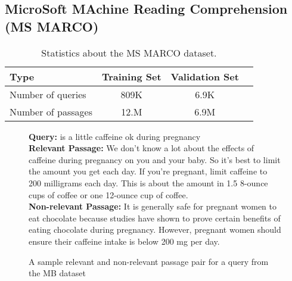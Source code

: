 \subsection{MicroSoft MAchine Reading Comprehension (MS MARCO)}

\begin{table}[b]
\vspace{0.2cm}
\centering
\begin{tabular}{lccc}
\toprule
\textbf{Type} \mbox{\hspace{0.5cm}} & \textbf{Training Set} \mbox{\hspace{1.0cm}} & \textbf{Validation Set} \mbox{\hspace{1.0cm}} \\
\toprule
Number of queries & 809K & 6.9K \\
Number  of passages & 12.M & 6.9M \\
\bottomrule
\end{tabular}
\vspace{0.2cm}
\caption{Statistics about the MS MARCO dataset.}
\label{tab:marco-stats}
\end{table}

\begin{figure}[b!]
	\begin{framed}
		\centering
    		\textbf{Query:} is a little caffeine ok during pregnancy \\
    		\textbf{Relevant Passage:} We don't know a lot about the effects of caffeine during pregnancy on you and your baby. So it's best to limit the amount you get each day. If you're pregnant, limit caffeine to 200 milligrams each day. This is about the amount in 1.5 8-ounce cups of coffee or one 12-ounce cup of coffee. \\
    		\textbf{Non-relevant Passage:} It is generally safe for pregnant women to eat chocolate because studies have shown to prove certain benefits of eating chocolate during pregnancy. However, pregnant women should ensure their caffeine intake is below 200 mg per day. \\
	\end{framed}
\label{marco-example}
 \caption{A sample relevant and non-relevant passage pair for a query from the MB dataset}
\end{figure}


